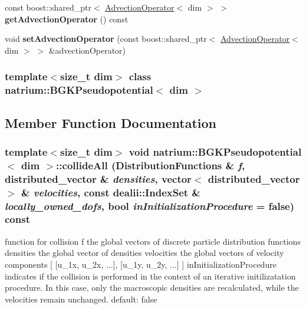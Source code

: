 \begin{DoxyCompactItemize}
\item 
\hypertarget{classnatrium_1_1BGKPseudopotential_af74dc4543db83980469a322046772e06}{
const boost::shared\_\-ptr$<$ \hyperlink{classnatrium_1_1AdvectionOperator}{AdvectionOperator}$<$ dim $>$ $>$ {\bfseries getAdvectionOperator} () const }
\label{classnatrium_1_1BGKPseudopotential_af74dc4543db83980469a322046772e06}

\item 
\hypertarget{classnatrium_1_1BGKPseudopotential_ab526496c8e4f405355856a6e0ef6a1b1}{
void {\bfseries setAdvectionOperator} (const boost::shared\_\-ptr$<$ \hyperlink{classnatrium_1_1AdvectionOperator}{AdvectionOperator}$<$ dim $>$ $>$ \&advectionOperator)}
\label{classnatrium_1_1BGKPseudopotential_ab526496c8e4f405355856a6e0ef6a1b1}

\end{DoxyCompactItemize}
\subsubsection*{template$<$size\_\-t dim$>$ class natrium::BGKPseudopotential$<$ dim $>$}



\subsection{Member Function Documentation}
\hypertarget{classnatrium_1_1BGKPseudopotential_afa18cdab45c73c33b2660f37d0ca82ba}{
\subsubsection[{collideAll}]{\setlength{\rightskip}{0pt plus 5cm}template$<$size\_\-t dim$>$ void {\bf natrium::BGKPseudopotential}$<$ dim $>$::collideAll ({\bf DistributionFunctions} \& {\em f}, \/  {\bf distributed\_\-vector} \& {\em densities}, \/  vector$<$ {\bf distributed\_\-vector} $>$ \& {\em velocities}, \/  const dealii::IndexSet \& {\em locally\_\-owned\_\-dofs}, \/  bool {\em inInitializationProcedure} = {\ttfamily false}) const}}
\label{classnatrium_1_1BGKPseudopotential_afa18cdab45c73c33b2660f37d0ca82ba}


function for collision f the global vectors of discrete particle distribution functions densities the global vector of densities velocities the global vectors of velocity components \mbox{[} \mbox{[}u\_\-1x, u\_\-2x, ...\mbox{]}, \mbox{[}u\_\-1y, u\_\-2y, ...\mbox{]} \mbox{]} inInitializationProcedure indicates if the collision is performed in the context of an iterative initilizatation procedure. In this case, only the macroscopic densities are recalculated, while the velocities remain unchanged. default: false 

